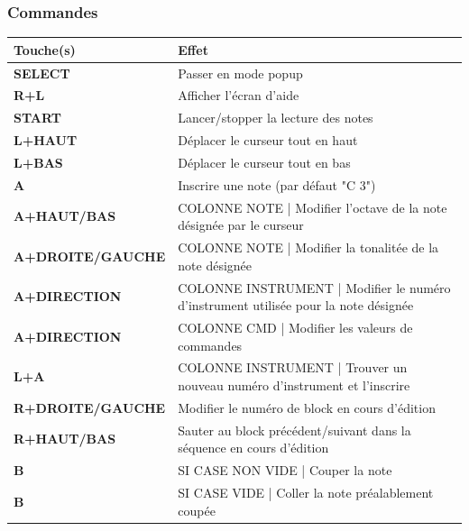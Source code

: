 \documentclass[12pt,a4paper]{article}
\begin{document}
    \subsubsection{Commandes}
    \tablelasttail{\hline}
    \begin{tabular}{|l|p{11cm}|}
    \hline
        \rowcolor{headertab} {\bf Touche(s)} & {\bf Effet} \\
        \hline
        {\bf SELECT} & Passer en mode popup \\
        \hline
        {\bf R+L} & Afficher l'écran d'aide \\
        \hline
        {\bf START} & Lancer/stopper la lecture des notes \\
        \hline
        {\bf L+HAUT} & Déplacer le curseur tout en haut \\
        \hline
        {\bf L+BAS} & Déplacer le curseur tout en bas \\
        \hline
        {\bf A} & Inscrire une note (par défaut "C 3") \\
        \hline
        {\bf A+HAUT/BAS} & COLONNE NOTE | Modifier l'octave de la note désignée par le curseur \\
        \hline
        {\bf A+DROITE/GAUCHE} & COLONNE NOTE | Modifier la tonalitée de la note désignée \\
        \hline
        {\bf A+DIRECTION} & COLONNE INSTRUMENT | Modifier le numéro d'instrument utilisée pour la note désignée \\
        \hline
        {\bf A+DIRECTION} & COLONNE CMD | Modifier les valeurs de commandes \\
        \hline
        {\bf L+A} & COLONNE INSTRUMENT | Trouver un nouveau numéro d'instrument et l'inscrire \\
        \hline
        {\bf R+DROITE/GAUCHE} & Modifier le numéro de block en cours d'édition \\
        \hline
        {\bf R+HAUT/BAS} & Sauter au block précédent/suivant dans la séquence en cours d'édition \\
        \hline
        {\bf B} & SI CASE NON VIDE | Couper la note \\
        \hline
        {\bf B} & SI CASE VIDE | Coller la note préalablement coupée \\
    \hline
    \end{tabular}
    
\end{document}
